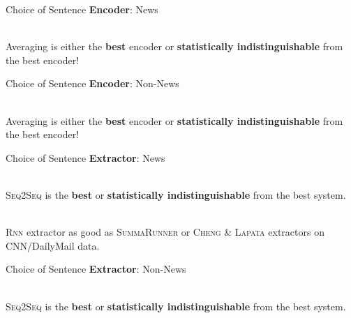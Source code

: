 

\begin{frame}{Choice of Sentence \textbf{Encoder}: News}
  \begin{center}
      
  \end{center}
  ~\\

  Averaging is either the \alert{\textbf{best}} encoder or 
  \textbf{statistically indistinguishable} from the best encoder!

\end{frame}

\begin{frame}{Choice of Sentence \textbf{Encoder}: Non-News}
  \begin{center}
        
  \end{center}
  ~\\

  Averaging is either the \alert{\textbf{best}} encoder or 
  \textbf{statistically indistinguishable} from the best encoder!
\end{frame}

\begin{frame}{Choice of Sentence \textbf{Extractor}: News}
    
 \begin{center}
   
 \end{center}
 
 ~\\

 \textsc{Seq2Seq} is the \alert{\textbf{best}} or \textbf{statistically 
 indistinguishable} from the best system.

 ~\\
 \textsc{Rnn} extractor as good as \textsc{SummaRunner} or 
 \textsc{Cheng \& Lapata} extractors on CNN/DailyMail data.

  

\end{frame}

\begin{frame}{Choice of Sentence \textbf{Extractor}: Non-News}
    
 \begin{center}
   
 \end{center}

 ~\\

 \textsc{Seq2Seq} is the \alert{\textbf{best}} or \textbf{statistically indistinguishable} from the best
 system.


\end{frame}



